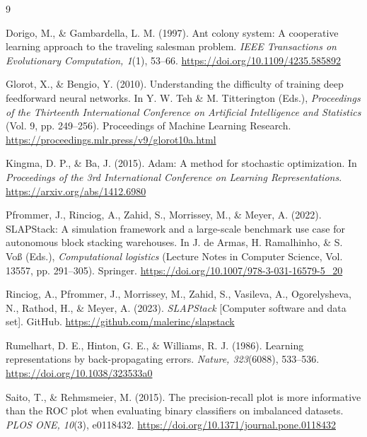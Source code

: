 \documentclass[10pt]{article}
\begin{document}
\begin{thebibliography}{9}

Dorigo, M., \& Gambardella, L. M. (1997). Ant colony system: A cooperative learning approach to the traveling salesman problem. \emph{IEEE Transactions on Evolutionary Computation, 1}(1), 53--66. \url{https://doi.org/10.1109/4235.585892}

Glorot, X., \& Bengio, Y. (2010). Understanding the difficulty of training deep feedforward neural networks. In Y. W. Teh \& M. Titterington (Eds.), \emph{Proceedings of the Thirteenth International Conference on Artificial Intelligence and Statistics} (Vol. 9, pp. 249--256). Proceedings of Machine Learning Research. \url{https://proceedings.mlr.press/v9/glorot10a.html}

Kingma, D. P., \& Ba, J. (2015). Adam: A method for stochastic optimization. In \emph{Proceedings of the 3rd International Conference on Learning Representations}. \url{https://arxiv.org/abs/1412.6980}

Pfrommer, J., Rinciog, A., Zahid, S., Morrissey, M., \& Meyer, A. (2022). SLAPStack: A simulation framework and a large-scale benchmark use case for autonomous block stacking warehouses. In J. de Armas, H. Ramalhinho, \& S. Vo\ss{} (Eds.), \emph{Computational logistics} (Lecture Notes in Computer Science, Vol. 13557, pp. 291--305). Springer. \url{https://doi.org/10.1007/978-3-031-16579-5_20}

Rinciog, A., Pfrommer, J., Morrissey, M., Zahid, S., Vasileva, A., Ogorelysheva, N., Rathod, H., \& Meyer, A. (2023). \emph{SLAPStack} [Computer software and data set]. GitHub. \url{https://github.com/malerinc/slapstack}

Rumelhart, D. E., Hinton, G. E., \& Williams, R. J. (1986). Learning representations by back-propagating errors. \emph{Nature, 323}(6088), 533--536. \url{https://doi.org/10.1038/323533a0}

Saito, T., \& Rehmsmeier, M. (2015). The precision-recall plot is more informative than the ROC plot when evaluating binary classifiers on imbalanced datasets. \emph{PLOS ONE, 10}(3), e0118432. \url{https://doi.org/10.1371/journal.pone.0118432}

\end{thebibliography}
\end{document}
